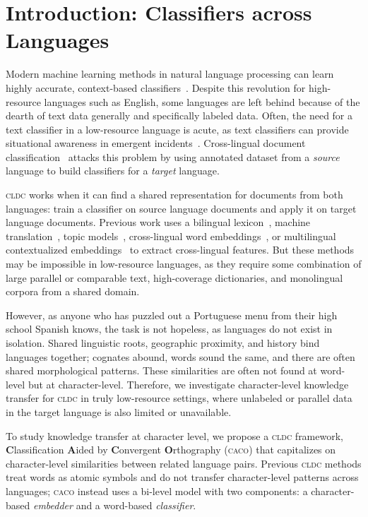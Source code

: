\documentclass[letterpaper]{article} %
\newcommand{\citep}{\cite}
\newcommand{\abr}[1]{\textsc{#1}}
\newcommand{\name}[0]{\textsc{caco}}
\begin{document}
\section{Introduction: Classifiers across Languages}

Modern machine learning methods in natural language processing can learn highly
accurate, context-based classifiers~\citep{devlin-19}.
Despite this revolution for high-resource languages such as English, some
languages are left behind because of the dearth of text data generally and
specifically labeled data.
Often, the need for a text classifier in a low-resource language is acute, as
text classifiers can provide situational awareness in emergent
incidents~\citep{strassel-16}.
Cross-lingual document
classification~\citep[\abr{cldc}]{klementiev-12} attacks this problem
by using annotated dataset from a \emph{source} language to build
classifiers for a \emph{target} language.

\abr{cldc} works when it can find a shared representation for
documents from both languages: train a classifier on source language
documents and apply it on target language documents.
Previous work uses a bilingual lexicon~\citep{shi-10,andrade-15}, machine
translation~\citep[\abr{mt}]{banea-08-fixed,wan-09-fixed,zhou-16}, topic
models~\citep{mimno-09-fixed,yuan-18}, cross-lingual word
embeddings~\citep[\abr{clwe}]{klementiev-12}, or multilingual contextualized
embeddings~\citep{wu-19} to extract cross-lingual features.
But these methods may be impossible in low-resource languages, as they require
some combination of large parallel or comparable text, high-coverage
dictionaries, and monolingual corpora from a shared domain.

However, as anyone who has puzzled out a Portuguese menu from their
high school Spanish knows, the task is not hopeless, as languages do
not exist in isolation.
Shared linguistic roots, geographic proximity, and history bind
languages together; cognates abound, words sound the same, and there
are often shared morphological patterns.
These similarities are often not found at word-level but at character-level.
Therefore, we investigate character-level knowledge transfer for \abr{cldc} in
truly low-resource settings, where unlabeled or parallel data in the target
language is also limited or unavailable.

To study knowledge transfer at character level, we propose a \abr{cldc}
framework, {\bf C}lassification {\bf A}ided by {\bf C}onvergent {\bf
O}rthography (\name{}) that capitalizes on character-level similarities between
related language pairs.
Previous \abr{cldc} methods treat words as atomic symbols and do not transfer
character-level patterns across languages; \name{} instead uses a bi-level
model with two components: a character-based \emph{embedder} and a word-based
\emph{classifier}.
\end{document}
